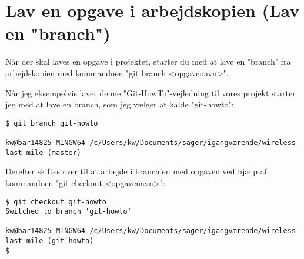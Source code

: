 \documentclass[11pt,a4paper,twoside]{report}
\begin{document}
\section{Lav en opgave i arbejdskopien (Lav en "branch")}
Når der skal laves en opgave i projektet, starter du med at lave en "branch" fra arbejdskopien med kommandoen "git branch <opgavenavn>".
\par
Når jeg eksempelvis laver denne "Git-HowTo"-vejledning til vores projekt starter jeg med at lave en branch, som jeg vælger at kalde "git-howto":
\begin{verbatim}
$ git branch git-howto

kw@bar14825 MINGW64 /c/Users/kw/Documents/sager/igangværende/wireless-last-mile (master)
\end{verbatim}

Derefter skiftes over til at arbejde i branch'en med opgaven ved hjælp af kommandoen "git checkout <opgavenavn>":
\begin{verbatim}
$ git checkout git-howto
Switched to branch 'git-howto'

kw@bar14825 MINGW64 /c/Users/kw/Documents/sager/igangværende/wireless-last-mile (git-howto)
$
\end{verbatim}
\end{document}
